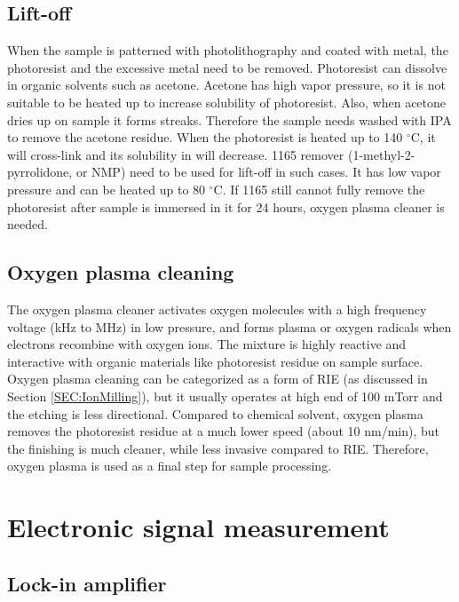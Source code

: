 \documentclass[pdflatex, sectionletters, 12pt]{pittetd}    %
\begin{document}
\subsection{Lift-off}

When the sample is patterned with photolithography and coated with metal, the photoresist and the excessive metal need to be removed. Photoresist can dissolve in organic solvents such as acetone. Acetone has high vapor pressure, so it is not suitable to be heated up to increase solubility of photoresist. Also, when acetone dries up on sample it forms streaks. Therefore the sample needs washed with IPA to remove the acetone residue. When the photoresist is heated up to 140 $^{\circ}$C, it will cross-link and its solubility in will decrease. 1165 remover (1-methyl-2-pyrrolidone, or NMP) need to be used for lift-off in such cases. It has low vapor pressure and can be heated up to 80 $^{\circ}$C. If 1165 still cannot fully remove the photoresist after sample is immersed in it for 24 hours, oxygen plasma cleaner is needed.

\subsection{Oxygen plasma cleaning}

The oxygen plasma cleaner activates oxygen molecules with a high frequency voltage (kHz to MHz) in low pressure, and forms plasma or oxygen radicals when electrons recombine with oxygen ions. The mixture is highly reactive and interactive with organic materials like photoresist residue on sample surface. Oxygen plasma cleaning can be categorized as a form of RIE (as discussed in Section \ref{SEC:IonMilling}), but it usually operates at high end of 100 mTorr and the etching is less directional. Compared to chemical solvent, oxygen plasma removes the photoresist residue at a much lower speed (about 10 nm/min), but the finishing is much cleaner, while less invasive compared to RIE. Therefore, oxygen plasma is used as a final step for sample processing.


\section{Electronic signal measurement}

\subsection{Lock-in amplifier}
\end{document}
